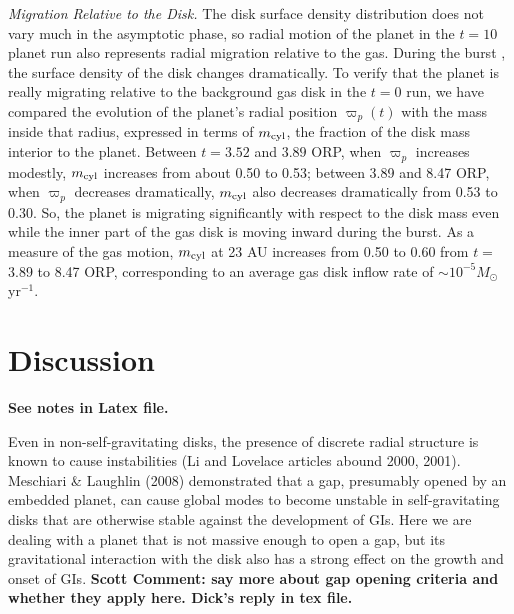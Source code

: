 \documentclass[12pt,manuscript,authoryear]{aastex}
\begin{document}
{\it Migration Relative to the Disk.} The disk surface density distribution does not vary much in the asymptotic phase, so radial motion of the planet in the $t = 10$ planet run also represents radial migration relative to the gas. During the burst \citep[e.g.,][]{boley2006}, the surface density of the disk changes dramatically. To verify that the planet is really migrating relative to the background gas disk in the $t = 0$ run, we have compared the evolution of the planet's radial position $\varpi_p(t)$ with the mass inside that radius, expressed in terms of $m_{\rm cyl}$, the fraction of the disk mass interior to the planet. Between $t = 3.52$ and $3.89$ ORP, when $\varpi_p$ increases modestly, $m_{\rm cyl}$ increases from about 0.50 to 0.53; between 3.89 and 8.47 ORP, when $\varpi_p$ decreases dramatically, $m_{\rm cyl}$ also decreases dramatically from 0.53 to 0.30. So, the planet is migrating significantly with respect to the disk mass even while the inner part of the gas disk is moving inward during the burst. As a measure of the gas motion, $m_{\rm cyl}$ at 23 AU increases from 0.50 to 0.60 from $t =$ 3.89 to 8.47 ORP, corresponding to an average gas disk inflow rate of $\sim 10^{-5} M_{\odot}$ yr$^{-1}$.

\section{Discussion}

{\bf See notes in Latex file.}

Even in non-self-gravitating disks, the presence of discrete radial structure is known to cause instabilities (Li and Lovelace articles abound 2000, 2001). Meschiari \& Laughlin (2008) demonstrated that a gap, presumably opened by an embedded planet, can cause global modes to become unstable in self-gravitating disks that are otherwise stable against the development of GIs. Here we are dealing with a planet that is not massive enough to open a gap, but its gravitational interaction with the disk also has a strong effect on the growth and onset of GIs. {\bf Scott Comment: say more about gap opening criteria and whether they apply here. Dick's reply in tex file.}
 
\end{document}
